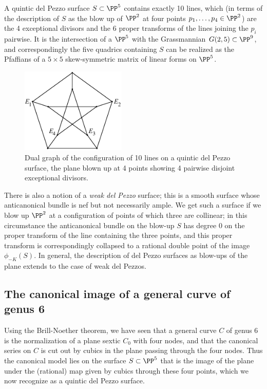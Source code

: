 A quintic del Pezzo surface $S \subset \PP^5$ contains exactly 10 lines, which (in terms of the description of $S$ as the blow up of $\PP^2$ at four points $p_1,\dots,p_4 \in \PP^2$) are the 4 exceptional divisors and the 6 proper transforms of the lines joining the $p_i$ pairwise. 
It is the intersection of a $\PP^5$ with the Grassmannian $G(2,5) \subset \PP^9$, and correspondingly the five quadrics containing $S$ can be realized as the Pfaffians of a  $5\times 5$ skew-symmetric matrix of linear forms on $\PP^5$.

\begin{figure}
\centerline {\includegraphics[height=1.6in]{"main/Fig11-5"}}
\caption{Dual graph of the configuration of 10 lines on a quintic del Pezzo surface, the plane blown up
at 4 points showing 4 pairwise disjoint exceptional divisors.}
\label{dual graph of the configuration of 10 lines on a quintic del Pezzo surface}
\end{figure}

There is also a notion of a \emph{weak del Pezzo} surface; this is a smooth surface whose anticanonical bundle is nef but not necessarily ample. We get such a surface if we blow up $\PP^2$ at a configuration of points of which three are collinear; in this circumstance the anticanonical bundle on the blow-up $S$ has degree 0 on the proper transform of the line containing the three points, and this proper transform is correspondingly collapsed to a rational double point of the image $\phi_{-K}(S)$. In general, the description of del Pezzo surfaces as blow-ups of the plane extends to the case of weak del Pezzos.



\subsection{The canonical image of a general curve of genus 6}

Using the Brill-Noether theorem, we have seen that a general curve $C$ of genus 6 is the normalization of a plane sextic $C_0$ with four nodes, and that the canonical series on $C$ is cut out by cubics in the plane passing through the four nodes. Thus the canonical model lies on the surface $S \subset \PP^5$ that is the image of the plane under the (rational) map given by cubics through these four points, which we now recognize as a quintic del Pezzo surface.

